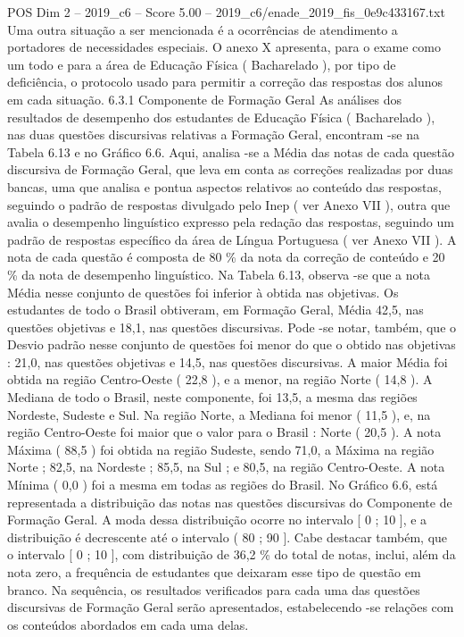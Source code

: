 \begin{textsample}{POS Dim 2 – 2019\_c6 – Score 5.00 – 2019\_c6/enade\_2019\_fis\_0e9c433167.txt}
Uma outra situação a ser mencionada é a ocorrências de atendimento a portadores de necessidades especiais.
O anexo X apresenta, para o exame como um todo e para a área de Educação Física ( Bacharelado ), por tipo de deficiência, o protocolo usado para permitir a correção das respostas dos alunos em cada situação. 6.3.1 Componente de Formação Geral As análises dos resultados de desempenho dos estudantes de Educação Física ( Bacharelado ), nas duas questões discursivas relativas a Formação Geral, encontram -se na Tabela 6.13 e no Gráfico 6.6.
Aqui, analisa -se a Média das notas de cada questão discursiva de Formação Geral, que leva em conta as correções realizadas por duas bancas, uma que analisa e pontua aspectos relativos ao conteúdo das respostas, seguindo o padrão de respostas divulgado pelo Inep ( ver Anexo VII ), outra que avalia o desempenho linguístico expresso pela redação das respostas, seguindo um padrão de respostas específico da área de Língua Portuguesa ( ver Anexo VII ).
A nota de cada questão é composta de 80 \% da nota da correção de conteúdo e 20 \% da nota de desempenho linguístico.
Na Tabela 6.13, observa -se que a nota Média nesse conjunto de questões foi inferior à obtida nas objetivas.
Os estudantes de todo o Brasil obtiveram, em Formação Geral, Média 42,5, nas questões objetivas e 18,1, nas questões discursivas.
Pode -se notar, também, que o Desvio padrão nesse conjunto de questões foi menor do que o obtido nas objetivas : 21,0, nas questões objetivas e 14,5, nas questões discursivas.
A maior Média foi obtida na região Centro-Oeste ( 22,8 ), e a menor, na região Norte ( 14,8 ).
A Mediana de todo o Brasil, neste componente, foi 13,5, a mesma das regiões Nordeste, Sudeste e Sul.
Na região Norte, a Mediana foi menor ( 11,5 ), e, na região Centro-Oeste foi maior que o valor para o Brasil : Norte ( 20,5 ).
A nota Máxima ( 88,5 ) foi obtida na região Sudeste, sendo 71,0, a Máxima na região Norte ; 82,5, na Nordeste ; 85,5, na Sul ; e 80,5, na região Centro-Oeste.
A nota Mínima ( 0,0 ) foi a mesma em todas as regiões do Brasil.
No Gráfico 6.6, está representada a distribuição das notas nas questões discursivas do Componente de Formação Geral.
A moda dessa distribuição ocorre no intervalo [ 0 ; 10 ], e a distribuição é decrescente até o intervalo ( 80 ; 90 ].
Cabe destacar também, que o intervalo [ 0 ; 10 ], com distribuição de 36,2 \% do total de notas, inclui, além da nota zero, a frequência de estudantes que deixaram esse tipo de questão em branco.
Na sequência, os resultados verificados para cada uma das questões discursivas de Formação Geral serão apresentados, estabelecendo -se relações com os conteúdos abordados em cada uma delas.

\end{textsample}
